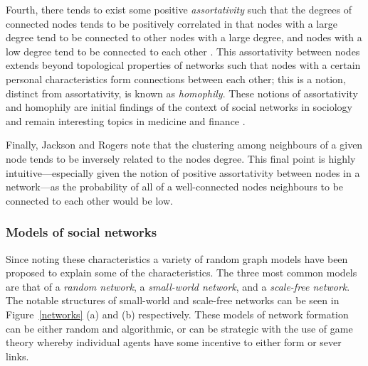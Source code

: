 Fourth, there tends to exist some positive \emph{assortativity} such that the degrees of connected nodes tends to be positively correlated in that nodes with a large degree tend to be connected to other nodes with a large degree, and nodes with a low degree tend to be connected to each other \citep{Newman2003mixing}. This assortativity between nodes extends beyond topological properties of networks such that nodes with a certain personal characteristics form connections between each other; this is a notion, distinct from assortativity, is known as \emph{homophily}. These notions of assortativity and homophily are initial findings of the context of social networks in sociology \citep{McPherson2001} and remain interesting topics in medicine and finance \citep{Haldane2009, HaldaneMay2011}.

Finally, Jackson and Rogers note that the clustering among neighbours of a given node tends to be inversely related to the nodes degree. This final point is highly intuitive---especially given the notion of positive assortativity between nodes in a network---as the probability of all of a well-connected nodes neighbours to be connected to each other would be low.

\subsubsection{Models of social networks}

Since noting these characteristics a variety of random graph models have been proposed to explain some of the characteristics. The three most common models are that of a \emph{random network}, a \emph{small-world network}, and a \emph{scale-free network}. The notable structures of small-world and scale-free networks can be seen in Figure~\ref{networks} (a) and (b) respectively. These models of network formation can be either random and algorithmic, or can be strategic with the use of game theory whereby individual agents have some incentive to either form or sever links.

